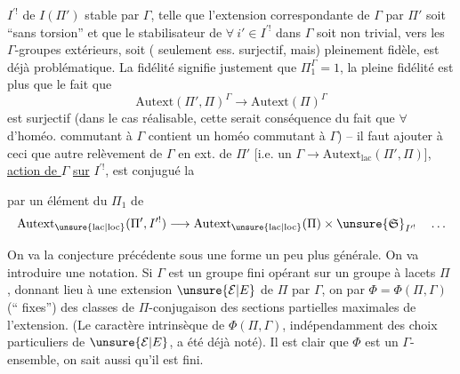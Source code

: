 $I^{\prime!}$ de $I(\Pi')$ stable par $\Gamma$, telle que l'extension correspondante de $\Gamma$ par $\Pi'$ soit ``sans torsion'' et que le stabilisateur de $\forall\ i'\in I^{\prime!}$ dans $\Gamma$ soit non trivial, vers les $\Gamma$-groupes extérieurs, soit ( seulement ess. surjectif, mais) pleinement fidèle, est déjà problématique. La fidélité signifie justement que $\Pi_1^\Gamma=1$, la pleine fidélité est plus  que le fait que 
\[
\mathrm{Autext}(\Pi',\Pi)^\Gamma\longrightarrow\mathrm{Autext}(\Pi)^\Gamma
\]
est surjectif (dans le cas réalisable, cette  serait conséquence du fait que $\forall$  d'homéo. commutant à $\Gamma$ contient un homéo commutant à $\Gamma$)
-- il faut ajouter à ceci que  autre relèvement de $\Gamma$ en  ext. de $\Pi'$ [i.e. un $\Gamma\longrightarrow\mathrm{Autext}_{\mathrm{lac}}(\Pi',\Pi)$],    \uline{action de $\Gamma$} \uline{sur} $I^{\prime!}$, est conjugué  la 

 par un élément du  $\Pi_1$ de
\[
\mathrm{Autext}_{\unsure{\mathrm{lac}|\mathrm{loc}}}(\Pi',I^{\prime!})
\longrightarrow
\mathrm{Autext}_{\unsure{\mathrm{lac}|\mathrm{loc}}}(\Pi)
\times \unsure{\mathfrak S}_{I^{\prime!}}\quad\ldots
\]

On va  la conjecture précédente sous une forme un peu plus générale.
On va introduire une notation. Si $\Gamma$ est un groupe fini opérant 
 sur un groupe à lacets $\Pi$ ,
donnant lieu à une extension $\unsure{\mathcal E|E}$ de $\Pi$ par $\Gamma$,
on   par $\Phi=\Phi(\Pi,\Gamma)$ (`` fixes'')
 des classes de $\Pi$-conjugaison des sections partielles
 maximales de l'extension.
(Le caractère intrinsèque de $\Phi(\Pi,\Gamma)$, indépendamment des choix particuliers de $\unsure{\mathcal E|E}$, a été déjà noté).
Il est clair que $\Phi$ est un $\Gamma$-ensemble, on sait aussi qu'il est fini.

